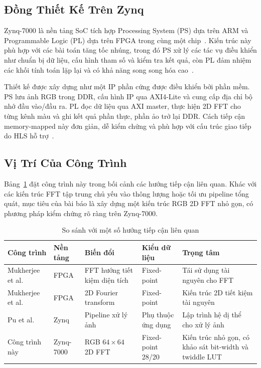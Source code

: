 ﻿\documentclass[conference]{IEEEtran}
\begin{document}
\subsection{Đồng Thiết Kế Trên Zynq}
Zynq-7000 là nền tảng SoC tích hợp Processing System (PS) dựa trên ARM và Programmable Logic (PL) dựa trên FPGA trong cùng một chip~\cite{xilinx_zynq_trm}. Kiến trúc này phù hợp với các bài toán tăng tốc nhúng, trong đó PS xử lý các tác vụ điều khiển như chuẩn bị dữ liệu, cấu hình tham số và kiểm tra kết quả, còn PL đảm nhiệm các khối tính toán lặp lại và có khả năng song song hóa cao~\cite{rajesh_zynq_codesign_2022}.

Thiết kế được xây dựng như một IP phần cứng được điều khiển bởi phần mềm. PS lưu ảnh RGB trong DDR, cấu hình IP qua AXI4-Lite và cung cấp địa chỉ bộ nhớ đầu vào/đầu ra. PL đọc dữ liệu qua AXI master, thực hiện 2D FFT cho từng kênh màu và ghi kết quả phần thực, phần ảo trở lại DDR. Cách tiếp cận memory-mapped này đơn giản, dễ kiểm chứng và phù hợp với cấu trúc giao tiếp do HLS hỗ trợ~\cite{amd_vitis_hls}.

\subsection{Vị Trí Của Công Trình}
Bảng~\ref{tab:related_work} đặt công trình này trong bối cảnh các hướng tiếp cận liên quan. Khác với các kiến trúc FFT tập trung chủ yếu vào thông lượng hoặc tối ưu pipeline tổng quát, mục tiêu của bài báo là xây dựng một kiến trúc RGB 2D FFT nhỏ gọn, có phương pháp kiểm chứng rõ ràng trên Zynq-7000.

\begin{table}[t]
    \caption{So sánh với một số hướng tiếp cận liên quan}
    \centering
    \label{tab:related_work}
    \setlength{\tabcolsep}{3pt}
    \begin{tabular}{p{}p{}p{}p{}p{}}
        \toprule
        \textbf{Công trình}                             & \textbf{Nền tảng} & \textbf{Biến đổi}             & \textbf{Kiểu dữ liệu} & \textbf{Trọng tâm}                                      \\
        \midrule
        Mukherjee et al.~\cite{mukherjee_fft_fpga_2015} & FPGA              & FFT hướng tiết kiệm diện tích & Fixed-point           & Tái sử dụng tài nguyên cho FFT                          \\
        Mukherjee et al.~\cite{mukherjee_2dfft_2018}    & FPGA              & 2D Fourier transform          & Fixed-point           & Kiến trúc 2D tiết kiệm tài nguyên                       \\
        Pu et al.~\cite{pu_halide_zynq_2016}            & Zynq              & Pipeline xử lý ảnh            & Phụ thuộc ứng dụng    & Lập trình hệ dị thể cho xử lý ảnh                       \\
        Công trình này                                  & Zynq-7000         & RGB $64\times64$ 2D FFT       & Fixed-point 28/20     & Kiến trúc nhỏ gọn, có khảo sát bit-width và twiddle LUT \\
        \bottomrule
    \end{tabular}
\end{table}
\end{document}
